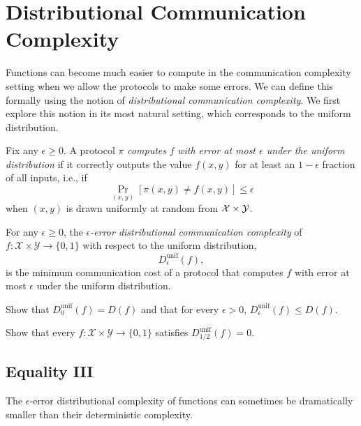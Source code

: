 \chapter[Distributional Complexity]{Distributional Communication Complexity}

Functions can become much easier to compute in the communication complexity setting when we allow the protocols to make some errors. We can define this formally using the notion of \emph{distributional communication complexity}. We first explore this notion in its most natural setting, which corresponds to the uniform distribution.

\begin{definition}
Fix any $\epsilon \ge 0$. A protocol $\pi$ \emph{computes} $f$ \emph{with error at most $\epsilon$ under the uniform distribution} if it correctly outputs the value $f(x,y)$ for at least an $1-\epsilon$ fraction of all inputs, i.e., if
\[
\Pr_{(x,y)}[ \pi(x,y) \neq f(x,y)] \le \epsilon
\]
when $(x,y)$ is drawn uniformly at random from $\mathcal{X} \times \mathcal{Y}$.
\end{definition}

\begin{definition}
For any $\epsilon \ge 0$, the \emph{$\epsilon$-error distributional communication complexity} of $f : \mathcal{X} \times \mathcal{Y} \to \{0,1\}$ with respect to the uniform distribution,
\[
D_\epsilon^{\mathrm{unif}}(f),
\]
is the minimum communication cost of a protocol that computes $f$ with error at most $\epsilon$ under the uniform distribution.
\end{definition}

\exercises

\begin{exercise}
Show that $D_0^{\mathrm{unif}}(f) = D(f)$ and that for every $\epsilon > 0$, 
$D_\epsilon^{\mathrm{unif}}(f) \le D(f)$.
\end{exercise}

\begin{exercise}
Show that every $f : \mathcal{X} \times \mathcal{Y} \to \{0,1\}$ satisfies
$D_{1/2}^{\mathrm{unif}}(f) = 0$.
\end{exercise}


\newpage \section{Equality III}

The $\epsilon$-error distributional complexity of functions can sometimes be dramatically smaller than their deterministic complexity.

